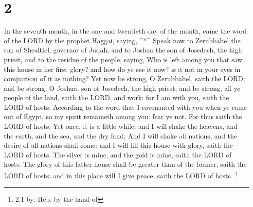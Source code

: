 \hypertarget{section-1}{%
\section{2}\label{section-1}}

 In the seventh month, in the one and twentieth day of the
month, came the word of the LORD by the prophet Haggai, saying,
\^{}*\^{}  Speak now to Zerubbabel the son of Shealtiel,
governor of Judah, and to Joshua the son of Josedech, the high priest,
and to the residue of the people, saying,  Who is left among
you that saw this house in her first glory? and how do ye see it now? is
it not in your eyes in comparison of it as nothing?  Yet now
be strong, O Zerubbabel, saith the LORD; and be strong, O Joshua, son of
Josedech, the high priest; and be strong, all ye people of the land,
saith the LORD, and work: for I am with you, saith the LORD of hosts:
 According to the word that I covenanted with you when ye
came out of Egypt, so my spirit remaineth among you: fear ye not.
 For thus saith the LORD of hosts; Yet once, it is a little
while, and I will shake the heavens, and the earth, and the sea, and the
dry land;  And I will shake all nations, and the desire of
all nations shall come: and I will fill this house with glory, saith the
LORD of hosts.  The silver is mine, and the gold is mine,
saith the LORD of hosts.  The glory of this latter house
shall be greater than of the former, saith the LORD of hosts: and in
this place will I give peace, saith the LORD of hosts. \footnote{2.1 by:
  Heb. by the hand of}

